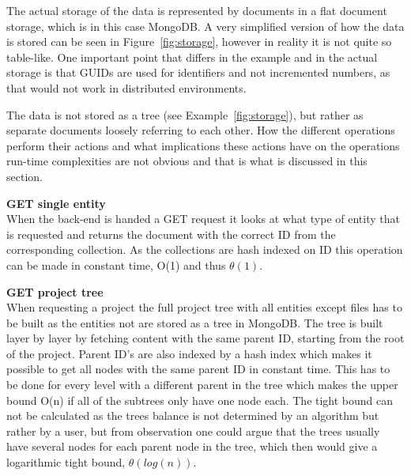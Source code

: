 \documentclass[a4paper,12pt]{article}
\begin{document}
The actual storage of the data is represented by documents in a flat document storage, which is in
this case MongoDB. A very simplified version of how the data is stored can be seen in
Figure~\ref{fig:storage}, however in reality it is not quite so table-like. One important point that
differs in the example and in the actual storage is that GUIDs are used for identifiers and not
incremented numbers, as that would not work in distributed environments. 

The data is not stored as a tree (see Example~\ref{fig:storage}), but rather as separate documents 
loosely referring to each other. How the different operations perform their actions and what 
implications these actions have on the operations run-time complexities are not obvious and that 
is what is discussed in this section.\\

\par \textbf{GET single entity} \\
When the back-end is handed a GET request it looks at what type of entity that is requested and
returns the document with the correct ID from the corresponding collection. As the collections are
hash indexed on ID this operation can be made in constant time, O(1) and thus $\theta(1)$. \\

\par \textbf{GET project tree} \\
When requesting a project the full project tree with all entities except files has to be built as
the entities not are stored as a tree in MongoDB. The tree is built layer by layer by fetching
content with the same parent ID, starting from the root of the project. Parent ID's are also indexed
by a hash index which makes it possible to get all nodes with the same parent ID in constant time.
This has to be done for every level with a different parent in the tree which makes the upper bound
O(n) if all of the subtrees only have one node each. The tight bound can not be calculated as the
trees balance is not determined by an algorithm but rather by a user, but from observation one could
argue that the trees usually have several nodes for each parent node in the tree, which then would
give a logarithmic tight bound, $\theta(log(n))$.\\
\end{document}
